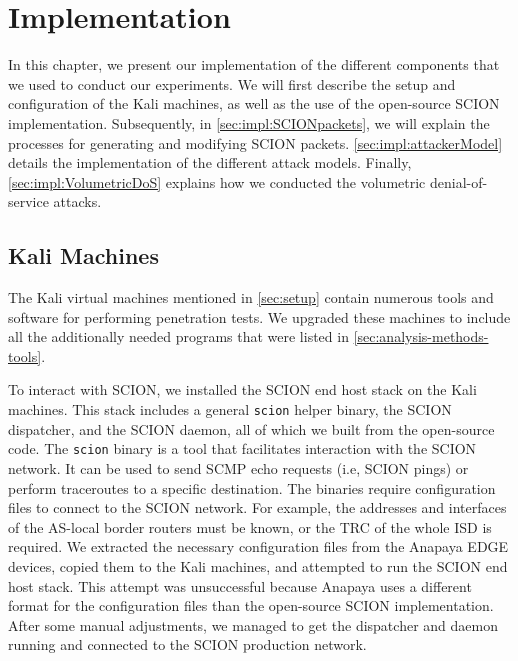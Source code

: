 \chapter{Implementation}
\label{ch:implementation}


In this chapter, we present our implementation of the different components that we used to conduct our experiments.
We will first describe the setup and configuration of the Kali machines, as well as the use of the open-source SCION implementation.
Subsequently, in \cref{sec:impl:SCIONpackets}, we will explain the processes for generating and modifying SCION packets.
\cref{sec:impl:attackerModel} details the implementation of the different attack models.
Finally, \cref{sec:impl:VolumetricDoS} explains how we conducted the volumetric denial-of-service attacks.

\section{Kali Machines}

The Kali virtual machines mentioned in \cref{sec:setup} contain numerous tools and software for performing penetration tests.
We upgraded these machines to include all the additionally needed programs that were listed in \cref{sec:analysis-methods-tools}.

To interact with SCION, we installed the SCION end host stack on the Kali machines.
This stack includes a general \texttt{scion} helper binary, the SCION dispatcher, and the SCION daemon, all of which we built from the open-source code.
The \texttt{scion} binary is a tool that facilitates interaction with the SCION network.
It can be used to send SCMP echo requests (i.e, SCION pings) or perform traceroutes to a specific destination.
The binaries require configuration files to connect to the SCION network.
For example, the addresses and interfaces of the AS-local border routers must be known, or the TRC of the whole ISD is required.
We extracted the necessary configuration files from the Anapaya EDGE devices, copied them to the Kali machines, and attempted to run the SCION end host stack.
This attempt was unsuccessful because Anapaya uses a different format for the configuration files than the open-source SCION implementation.
After some manual adjustments, we managed to get the dispatcher and daemon running and connected to the SCION production network.


